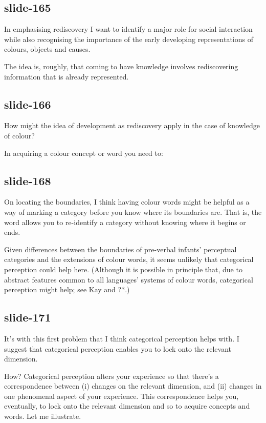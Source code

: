 \documentclass[12pt,\papersize]{extarticle}
\begin{document}
\subsection{slide-165}
In emphasising rediscovery I want to identify a major role for social interaction while
also recognising the importance of the early developing representations of colours, objects 
and causes.
 
The idea is, roughly, that coming to have knowledge involves rediscovering information that is
already represented.
 
\subsection{slide-166}
How might the idea of development as rediscovery apply in the case of knowledge of colour?
 
In acquiring a colour concept or word you need to:
 
\subsection{slide-168}
On locating the boundaries, I think having colour words might be helpful as a way of 
marking a category before you know where its boundaries are.
That is, the word allows you to re-identify a category without knowing where it begins 
or ends.
 
Given differences between the boundaries of pre-verbal infants' perceptual categories
and the extensions of colour words, it seems unlikely that categorical perception could 
help here.  (Although it is possible in principle that, due to abstract features common to 
all languages' systems of colour words, categorical perception might help; see Kay and ?*.)
 
\subsection{slide-171}
It's with this first problem that I think categorical perception helps with.
I suggest that categorical perception enables you to lock onto the relevant dimension.
 
How?
Categorical perception alters your experience so that there's a correspondence between 
(i) changes on the relevant dimension, and (ii) changes in one phenomenal aspect of your 
experience.
This correspondence helps you, eventually, to lock onto the relevant dimension and so to 
acquire concepts and words.
Let me illustrate.
 
\end{document}
